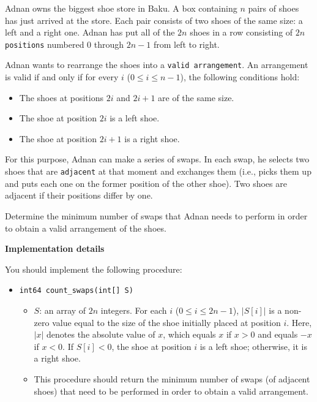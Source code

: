 Adnan owns the biggest shoe store in Baku.
A box containing $n$ pairs of shoes has just arrived at the store.
Each pair consists of two shoes of the same size: a left and a right one.
Adnan has put all of the $2n$ shoes in a row consisting of $2n$ \texttt{positions} numbered $0$ through $2n - 1$ from left to right.

Adnan wants to rearrange the shoes into a \texttt{valid arrangement}.
An arrangement is valid if and only if for every $i$ ($0 \leq i \leq n-1$), the following conditions hold:
\begin{itemize}
\item The shoes at positions $2i$ and $2i+1$ are of the same size.
\item The shoe at position $2i$ is a left shoe.
\item The shoe at position $2i+1$ is a right shoe.
\end{itemize}

For this purpose, Adnan can make a series of swaps.
In each swap, he selects two shoes that are \texttt{adjacent} at that moment and exchanges them (i.e., picks them up and puts each one on the former position of the other shoe).
Two shoes are adjacent if their positions differ by one.

Determine the minimum number of swaps that Adnan needs to perform in order to obtain a valid arrangement of the shoes.

\textbf{Implementation details}

You should implement the following procedure:

\begin{itemize}
\item \texttt{int64 count\_swaps(int[] S)}
\begin{itemize}
\item $S$: an array of $2n$ integers.
For each $i$ ($0 \leq i \leq 2n-1$), $|S[i]|$ is a non-zero value equal to the size of the shoe initially placed at position $i$.
Here, $|x|$ denotes the absolute value of $x$, which equals $x$ if $x>0$ and equals $-x$ if $x<0$.
If $S[i] < 0$, the shoe at position $i$ is a left shoe; otherwise, it is a right shoe.
\item This procedure should return the minimum number of swaps (of adjacent shoes) that need to be performed in order to obtain a valid arrangement.
\end{itemize}
\end{itemize}

